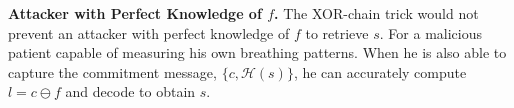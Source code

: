 {\bf Attacker with Perfect Knowledge of $f$.}
The XOR-chain trick would not prevent an attacker with perfect knowledge of $f$ to retrieve $s$. For a malicious patient capable of measuring his own breathing patterns. When he is also able to capture the commitment message, $\{c, \mathcal{H}(s)\}$, he can accurately compute $l = c  \ominus f$ and decode to obtain $s$. 


